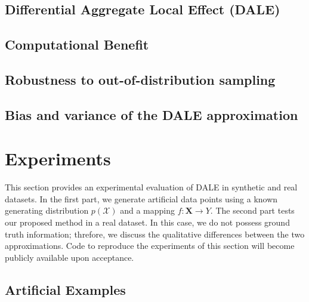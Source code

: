 \documentclass{article}
\begin{document}
\subsection{Differential Aggregate Local Effect (DALE)}
\label{sec:3-1-DALE}


\subsection{Computational Benefit}
\label{sec:3-2-computational}


\subsection{Robustness to out-of-distribution sampling}
\label{sec:3-3-robustness}


\subsection{Bias and variance of the DALE approximation}
\label{sec:3-4-std}


% 

\section{Experiments}

This section provides an experimental evaluation of DALE in
synthetic and real datasets. In the first part, we generate artificial
data points using a known generating distribution \(p(\mathcal{X}) \)
and a mapping \( f: \mathbf{X} \rightarrow Y \). The second part tests
our proposed method in a real dataset. In this case, we do not possess
ground truth information; threfore, we discuss the qualitative
differences between the two approximations. Code to reproduce the
experiments of this section will become publicly available upon
acceptance.

\subsection{Artificial Examples}

\end{document}
